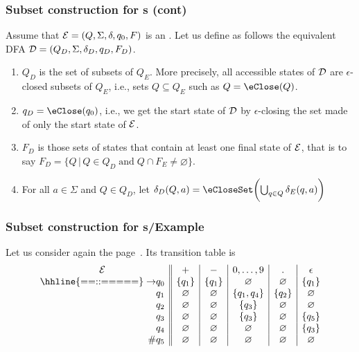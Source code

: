 % 
\begin{frame}
\frametitle{Subset construction for {\eNFA}s (cont)}

Assume that \({\cal E} = (Q, \Sigma, \delta, q_0, F)\) is an
\eNFA. Let us define as follows the equivalent DFA \({\cal D} = (Q_D,
\Sigma, \delta_D, q_D, F_D)\).
\begin{enumerate}

  \item \(Q_D\) is the set of subsets of \(Q_E\). More precisely, all
  accessible states of \(\cal D\) are \(\epsilon\)-closed subsets of
  \(Q_E\), i.e., sets \(Q \subseteq Q_E\) such as \(Q = \eClose(Q)\).

  \item \(q_D = \eClose (q_0)\), i.e., we get the start state
  of \(\cal D\) by \(\epsilon\)-closing the set made of only the start
  state of \(\cal E\).

  \item \(F_D\) is those sets of states that contain at least one
  final state of \(\cal E\), that is to say \(F_D = \{Q \, \lvert
  \, Q \in Q_D \; \text{and} \; Q \cap F_E \neq \varnothing\}\).

  \item For all \(a \in \Sigma\) and \(Q \in Q_D\), let
  \(
  \delta_D (Q, a) = \eCloseSet \biggl(\bigcup_{q \in Q}{\delta_E (q,
    a)}\biggr)
  \)

 \end{enumerate}

\end{frame}

% 
\begin{frame}
\frametitle{Subset construction for {\eNFA}s/Example}

Let us consider again the \eNFA page~\pageref{enfa_num}. Its transition
table is
\[
\begin{array}{r@{}l||c|c|c|c|c}
\multicolumn{2}{c||}{\cal E} & + & - & 0, \ldots, 9 & \mathtt{.} &
\epsilon\\
\hhline{==::=====}
\rightarrow & q_0 & \{q_1\} & \{q_1\} & \varnothing & \varnothing 
                  & \{q_1\}\\
            & q_1 & \varnothing  & \varnothing & \{q_1, q_4\} 
                  & \{q_2\} & \varnothing\\
            & q_2 & \varnothing  & \varnothing & \{q_3\} & \varnothing
                  & \varnothing\\
            & q_3 & \varnothing & \varnothing & \{q_3\} & \varnothing
                  & \{q_5\}\\
            & q_4 & \varnothing & \varnothing & \varnothing  
                  & \varnothing & \{q_3\}\\
         \# & q_5 & \varnothing & \varnothing & \varnothing 
                  & \varnothing & \varnothing 
\end{array}
\]

\end{frame}


